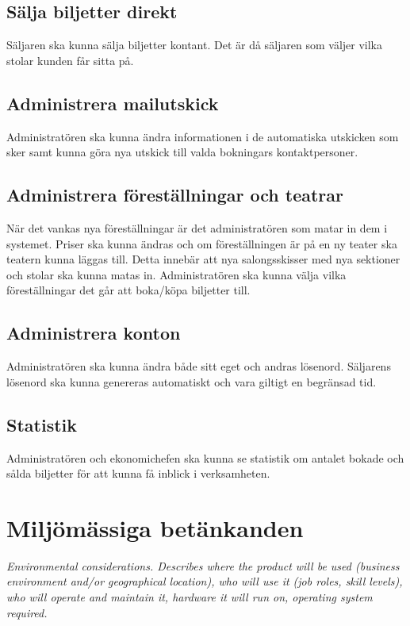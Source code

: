 \documentclass[a4paper, twoside, 11pt, titlepage]{article}
\begin{document}
	\subsection{Sälja biljetter direkt}


	Säljaren ska kunna sälja biljetter kontant. Det är då säljaren som väljer vilka stolar kunden får sitta på.

	\subsection{Administrera mailutskick}


	Administratören ska kunna ändra informationen i de automatiska utskicken som sker samt kunna göra nya utskick till valda bokningars kontaktpersoner.

	\subsection{Administrera föreställningar och teatrar}


	När det vankas nya föreställningar är det administratören som matar in dem i systemet. Priser ska kunna ändras och om föreställningen är på en ny teater ska teatern kunna läggas till. Detta innebär att nya salongsskisser med nya sektioner och stolar ska kunna matas in. Administratören ska kunna välja vilka föreställningar det går att boka/köpa biljetter till.

	\subsection{Administrera konton}


	Administratören ska kunna ändra både sitt eget och andras lösenord. Säljarens lösenord ska kunna genereras automatiskt och vara giltigt en begränsad tid.

	\subsection{Statistik}


	Administratören och ekonomichefen ska kunna se statistik om antalet bokade och sålda biljetter för att kunna få inblick i verksamheten.

\clearpage
\section{Miljömässiga betänkanden}


\emph{Environmental considerations. Describes where the product will be used (business environment and/or geographical location), who will use it (job roles, skill levels), who will operate and maintain it, hardware it will run on, operating system required.}
\end{document}
